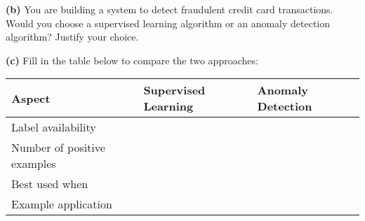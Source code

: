 \documentclass{article}
\begin{document}
\textbf{(b)} You are building a system to detect fraudulent credit card transactions. Would you choose a supervised learning algorithm or an anomaly detection algorithm? Justify your choice.
\vspace{0.5cm}

\textbf{(c)} Fill in the table below to compare the two approaches:

\begin{center}
\begin{tabular}{|l|l|l|}
\hline
\textbf{Aspect} & \textbf{Supervised Learning} & \textbf{Anomaly Detection} \\
\hline
Label availability & & \\
\hline
Number of positive examples & & \\
\hline
Best used when & & \\
\hline
Example application & & \\
\hline
\end{tabular}
\end{center}
\end{document}
